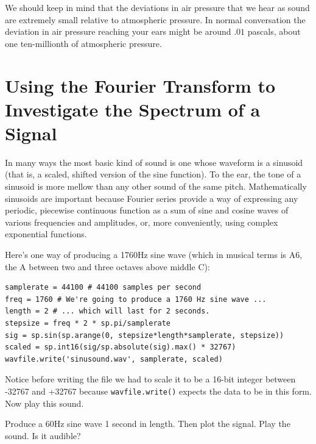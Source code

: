 We should keep in mind that the deviations in air pressure that we hear as sound are extremely small relative to atmospheric pressure. 
In normal conversation the deviation in air pressure reaching your ears might be around $.01$ pascals, about one ten-millionth of atmospheric pressure.


\section*{Using the Fourier Transform to Investigate the Spectrum of a Signal}

In many ways the most basic kind of sound is one whose waveform is a sinusoid (that is, a scaled, shifted version of the sine function). 
To the ear, the tone of a sinusoid is more mellow than any other sound of the same pitch. 
Mathematically sinusoids are important because Fourier series provide a way of expressing any periodic, piecewise continuous function as a sum of sine and cosine waves of various frequencies and amplitudes, or, more conveniently, using complex exponential functions.

Here's one way of producing a 1760Hz sine wave (which in musical terms is A6, the A between two and three octaves above middle C):
% 
\begin{lstlisting}
samplerate = 44100 # 44100 samples per second
freq = 1760 # We're going to produce a 1760 Hz sine wave ...
length = 2 # ... which will last for 2 seconds.
stepsize = freq * 2 * sp.pi/samplerate
sig = sp.sin(sp.arange(0, stepsize*length*samplerate, stepsize))
scaled = sp.int16(sig/sp.absolute(sig).max() * 32767)
wavfile.write('sinusound.wav', samplerate, scaled)
\end{lstlisting}

Notice before writing the file we had to scale it to be a 16-bit integer between -32767 and +32767 because \texttt{wavfile.write()} expects the data to be in this form.
Now play this sound.

\begin{problem}
Produce a 60Hz sine wave 1 second in length.
Then plot the signal.
Play the sound.
Is it audible?
\end{problem}


